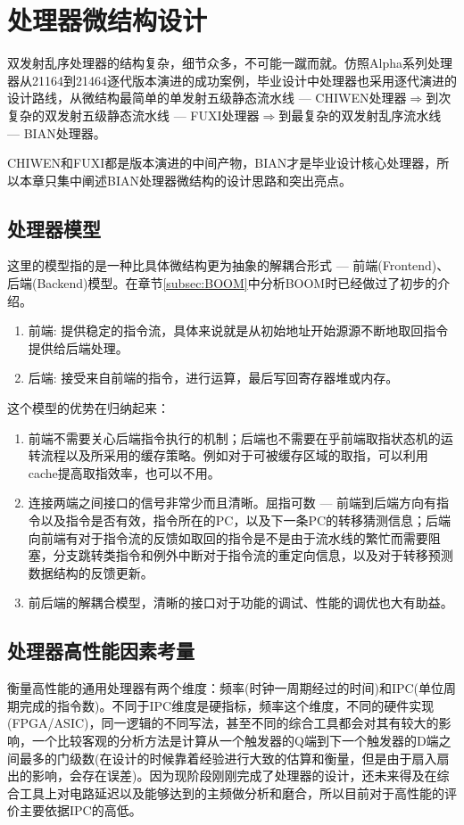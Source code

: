 \chapter{处理器微结构设计}\label{chap:design}
双发射乱序处理器的结构复杂，细节众多，不可能一蹴而就。仿照Alpha系列处理器从21164到21464逐代版本演进的成功案例，毕业设计中处理器也采用逐代演进的设计路线，从微结构最简单的单发射五级静态流水线 --- CHIWEN处理器$ \Rightarrow $到次复杂的双发射五级静态流水线 --- FUXI处理器$ \Rightarrow $到最复杂的双发射乱序流水线 --- BIAN处理器。

CHIWEN和FUXI都是版本演进的中间产物，BIAN才是毕业设计核心处理器，所以本章只集中阐述BIAN处理器微结构的设计思路和突出亮点。
\section{处理器模型}\label{sec:model}
这里的模型指的是一种比具体微结构更为抽象的解耦合形式 --- 前端(Frontend)、后端(Backend)模型。在章节\ref{subsec:BOOM}中分析BOOM时已经做过了初步的介绍。
\begin{enumerate}[label=(\alph*)]
	\item 前端: 提供稳定的指令流，具体来说就是从初始地址开始源源不断地取回指令提供给后端处理。
	\item 后端: 接受来自前端的指令，进行运算，最后写回寄存器堆或内存。
\end{enumerate}
这个模型的优势在归纳起来：
\begin{enumerate}[label=(\alph*)]
	\item 前端不需要关心后端指令执行的机制；后端也不需要在乎前端取指状态机的运转流程以及所采用的缓存策略。例如对于可被缓存区域的取指，可以利用cache提高取指效率，也可以不用。
	\item 连接两端之间接口的信号非常少而且清晰。屈指可数 --- 前端到后端方向有指令以及指令是否有效，指令所在的PC，以及下一条PC的转移猜测信息；后端向前端有对于指令流的反馈如取回的指令是不是由于流水线的繁忙而需要阻塞，分支跳转类指令和例外中断对于指令流的重定向信息，以及对于转移预测数据结构的反馈更新。
	\item 前后端的解耦合模型，清晰的接口对于功能的调试、性能的调优也大有助益。
\end{enumerate}
 
\section{处理器高性能因素考量}
衡量高性能的通用处理器有两个维度：频率(时钟一周期经过的时间)和IPC(单位周期完成的指令数)。不同于IPC维度是硬指标，频率这个维度，不同的硬件实现(FPGA/ASIC)，同一逻辑的不同写法，甚至不同的综合工具都会对其有较大的影响，一个比较客观的分析方法是计算从一个触发器的Q端到下一个触发器的D端之间最多的门级数(在设计的时候靠着经验进行大致的估算和衡量，但是由于扇入扇出的影响，会存在误差)。因为现阶段刚刚完成了处理器的设计，还未来得及在综合工具上对电路延迟以及能够达到的主频做分析和磨合，所以目前对于高性能的评价主要依据IPC的高低。

